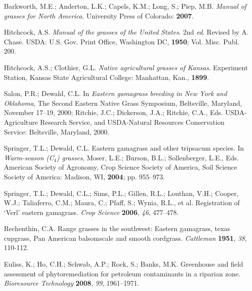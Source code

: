 \documentclass[agronomy,article,submit,moreauthors,pdftex,10pt,a4paper]{mdpi}
\theoremstyle{mdpi}
\newcounter{ex}
\newcounter{re}
\theoremstyle{mdpidefinition}
\begin{document}
\renewcommand\bibname{References}
\begin{thebibliography}{999}

Barkworth, M.E.; Anderton, L.K.; Capels, K.M.; Long, S.; Piep, M.B. \textit{Manual of grasses for North America}. University Press of Colorado: \textbf{2007}.

Hitchcock, A.S. \textit{Manual of the grasses of the United States}. 2nd \textit{ed}. Revised by A. Chase. USDA: U.S. Gov. Print Office, Washington DC, \textbf{1950}; Vol. Misc. Publ. 200.

Hitchcock, A.S.; Clothier, G.L. \textit{Native agricultural grasses of Kansas}. Experiment Station, Kansas State Agricultural College: Manhattan, Kan., \textbf{1899}.

Salon, P.R.; Dewald, C.L. In \textit{Eastern gamagrass breeding in New York and Oklahoma}, The Second Eastern Native Grass Symposium, Beltsville, Maryland, November 17–19, 2000; Ritchie, J.C.; Dickerson, J.A.; Ritchie, C.A., Eds. USDA-Agriculture Research Service, and USDA-Natural Resources Conservation Service: Beltsville, Maryland, 2000.

Springer, T.L.; Dewald, C.L. Eastern gamagrass and other tripsacum species. In \textit{Warm-season (C$_4$) grasses}, Moser, L.E.; Burson, B.L.; Sollenberger, L.E., Eds. American Society of Agronomy, Crop Science Society of America, Soil Science Society of America: Madison, WI, \textbf{2004}; pp. 955–973.


Springer, T.L.; Dewald, C.L.; Sims, P.L.; Gillen, R.L.; Louthan, V.H.; Cooper, W.J.; Taliaferro, C.M.; Maura, C.; Pfaff, S.; Wynia, R.L., et al. Registration of ‘Verl’ eastern gamagrass. \textit{Crop Science} \textbf{2006}, \textit{46}, 477–478.

Rechenthin, C.A. Range grasses in the southwest: Eastern gamagrass, texas cupgrass, Pan American balsomscale and smooth cordgrass. \textit{Cattleman} \textbf{1951}, \textit{38}, 110-112.

Euliss, K.; Ho, C.H.; Schwab, A.P.; Rock, S.; Banks, M.K. Greenhouse and field assessment of phytoremediation for petroleum contaminants in a riparian zone. \textit{Bioresource Technology} \textbf{2008}, \textit{99}, 1961–1971.


\end{thebibliography}
\end{document}

